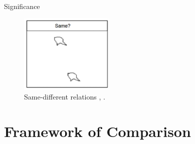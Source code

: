 \documentclass[xcolor={dvipsnames,svgnames}]{beamer}
\begin{document}
\begin{frame}{Significance}
\begin{itemize}
    \begin{figure}[H]
\centering
    \includegraphics[width=0.4\textwidth]{figures/intro/visusal-relation.jpg}
    \caption{Same-different relations \cite{visual-categorization}, \cite{not-so-clever}.}
\end{figure}
    
    
\end{itemize}
\end{frame}

\section[Framework]{Framework of Comparison}
\end{document}
